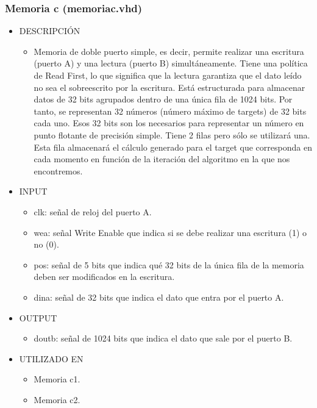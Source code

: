 \subsubsection{Memoria c (memoriac.vhd)}

\begin{itemize}
    \item DESCRIPCIÓN
        \begin{itemize}
            \item Memoria de doble puerto simple, es decir, permite realizar una escritura (puerto A) y una lectura (puerto B) simultáneamente. Tiene una política de Read First, lo que significa que la lectura garantiza que el dato leído no sea el sobreescrito por la escritura. Está estructurada para almacenar datos de 32 bits agrupados dentro de una única fila de 1024 bits. Por tanto, se representan 32 números (número máximo de targets) de 32 bits cada uno. Esos 32 bits son los necesarios para representar un número en punto flotante de precisión simple. Tiene 2 filas pero sólo se utilizará una. Esta fila almacenará el cálculo generado para el target que corresponda en cada momento en función de la iteración del algoritmo en la que nos encontremos.
        \end{itemize}
    \item INPUT
        \begin{itemize}
            \item clk: señal de reloj del puerto A.
            \item wea: señal Write Enable que indica si se debe realizar una escritura (1) o no (0).
            \item pos: señal de 5 bits que indica qué 32 bits de la única fila de la memoria deben ser modificados en la escritura.
            \item dina: señal de 32 bits que indica el dato que entra por el puerto A.
        \end{itemize}
    \item OUTPUT
        \begin{itemize}
            \item doutb: señal de 1024 bits que indica el dato que sale por el puerto B.
        \end{itemize}
    \item UTILIZADO EN
        \begin{itemize}
            \item Memoria c1.
            \item Memoria c2.
        \end{itemize}
\end{itemize}


